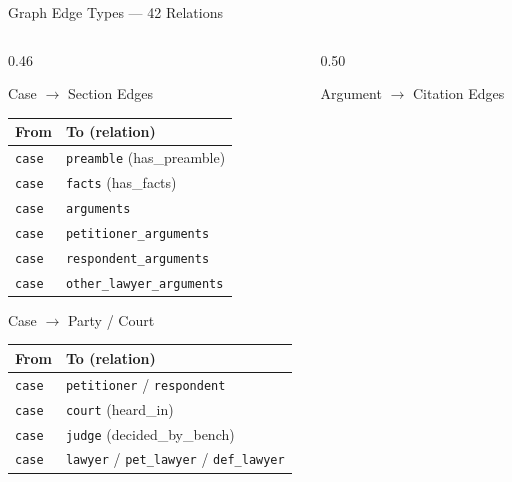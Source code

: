 \documentclass[aspectratio=169, 9pt]{beamer}
\begin{document}
\begin{frame}{Graph Edge Types — 42 Relations}
  \begin{columns}[T]
    \begin{column}{0.46\textwidth}
      \begin{block}{\small Case $\to$ Section Edges}
        \scriptsize\renewcommand{\arraystretch}{1.1}
        \begin{tabular}{ll}
          \toprule
          \textbf{From} & \textbf{To (relation)}\\
          \midrule
          \texttt{case} & \texttt{preamble} (has\_preamble)\\
          \texttt{case} & \texttt{facts} (has\_facts)\\
          \texttt{case} & \texttt{arguments}\\
          \texttt{case} & \texttt{petitioner\_arguments}\\
          \texttt{case} & \texttt{respondent\_arguments}\\
          \texttt{case} & \texttt{other\_lawyer\_arguments}\\
          \bottomrule
        \end{tabular}
      \end{block}
      \vspace{4pt}
      \begin{block}{\small Case $\to$ Party / Court}
        \scriptsize\renewcommand{\arraystretch}{1.1}
        \begin{tabular}{ll}
          \toprule
          \textbf{From} & \textbf{To (relation)}\\
          \midrule
          \texttt{case} & \texttt{petitioner} / \texttt{respondent}\\
          \texttt{case} & \texttt{court} (heard\_in)\\
          \texttt{case} & \texttt{judge} (decided\_by\_bench)\\
          \texttt{case} & \texttt{lawyer} / \texttt{pet\_lawyer} / \texttt{def\_lawyer}\\
          \bottomrule
        \end{tabular}
      \end{block}
    \end{column}
    \begin{column}{0.50\textwidth}
      \begin{block}{\small Argument $\to$ Citation Edges}
        \scriptsize\renewcommand{\arraystretch}{1.1}

\end{block}
\end{column}
\end{columns}
\end{frame}
\end{document}

